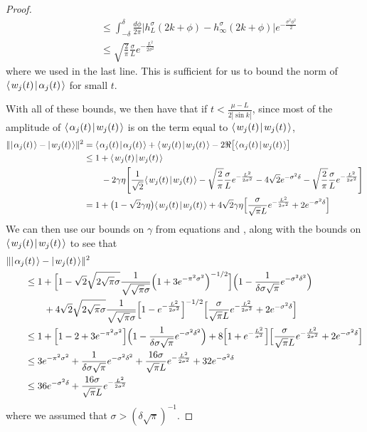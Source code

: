 \documentclass[../thesis-main/thesis-main]{subfiles}
\begin{document}
\begin{proof}
\begin{align}
  & \qquad \leq  \int_{-\delta}^\delta \frac{d\phi}{2\pi} \big|h_L^\sigma(2k + \phi) - h_\infty^\sigma(2k+\phi)\big| e^{-\frac{\sigma^2\phi^2}{2}}\\
  & \qquad \leq \sqrt{\frac{2}{\pi}} \frac{\sigma}{L} e^{-\frac{L^2}{2\sigma^2}}
\end{align}
where we used  in the last line.  This is sufficient for us to bound the norm of $\langle\mspace{2mu} w_j(t) \mspace{2mu} | \mspace{2mu} \alpha_j(t)\mspace{2mu} \rangle$ for small $t$.

With all of these bounds, we then have that if $t < \frac{\mu - L}{2|\sin k|}$, since most of the amplitude of $\langle\mspace{2mu} \alpha_j(t) \mspace{2mu} | \mspace{2mu} w_j(t)\mspace{2mu} \rangle$ is on the term equal to $\langle\mspace{2mu} w_j(t) \mspace{2mu} | \mspace{2mu} w_j(t)\mspace{2mu} \rangle$, 
\begin{align}
  \|{|\mspace{2mu} \alpha_j(t) \mspace{2mu} \rangle - |\mspace{2mu} w_j(t) \mspace{2mu} \rangle}\|^2 &= \langle\mspace{2mu} \alpha_j(t) \mspace{2mu} | \mspace{2mu} \alpha_j(t)\mspace{2mu} \rangle + \langle\mspace{2mu} w_j(t) \mspace{2mu} | \mspace{2mu} w_j(t)\mspace{2mu} \rangle - 2 \Re\big[ \langle\mspace{2mu} \alpha_j(t) \mspace{2mu} | \mspace{2mu} w_j(t)\mspace{2mu} \rangle \big]\\
  & \leq 1 + \langle\mspace{2mu} w_j(t) \mspace{2mu} | \mspace{2mu} w_j(t)\mspace{2mu} \rangle\nonumber\\
  &\qquad  - 2\gamma\eta  \Bigg[ \frac{1}{\sqrt{2}} \langle\mspace{2mu} w_j(t) \mspace{2mu} | \mspace{2mu} w_j(t)\mspace{2mu} \rangle - \sqrt{\frac{2}{\pi}} \frac{\sigma}{L} e^{-\frac{L^2}{2\sigma^2}} - 4 \sqrt{2} e^{-\sigma^2 \delta} - \sqrt{\frac{2}{\pi}} \frac{\sigma}{L} e^{-\frac{L^2}{2\sigma^2}}  \Bigg] \\
  & = 1 + \big( 1 - \sqrt{2} \gamma \eta\big) \langle\mspace{2mu} w_j(t) \mspace{2mu} | \mspace{2mu} w_j(t)\mspace{2mu} \rangle + 4 \sqrt{2} \gamma \eta \Big[\frac{ \sigma}{\sqrt{\pi} L} e^{ - \frac{L^2}{2\sigma^2}} + 2 e^{ - \sigma^2 \delta} \Big] 
\end{align}
We can then use our bounds on $\gamma$ from equations  and , along with the bounds on $\langle\mspace{2mu} w_j(t) \mspace{2mu} | \mspace{2mu} w_j(t)\mspace{2mu} \rangle$ to see that
\begin{align}
  &\|{|\mspace{2mu} \alpha_j(t) \mspace{2mu} \rangle - |\mspace{2mu} w_j(t) \mspace{2mu} \rangle}\|^2 \nonumber\\
  &\qquad \leq 1 + \Big[ 1 - \sqrt{2} \sqrt{2\sqrt{\pi} \sigma} \frac{1}{\sqrt{ \sqrt{\pi} \sigma}} \Big( 1 + 3 e^{ - \pi^2\sigma^2} \Big)^{-1/2} \Big] \Big( 1 - \frac{1}{\delta \sigma \sqrt{\pi}} e^{-\sigma^2\delta^2}\Big)\nonumber\\
  &\qquad \qquad + 4 \sqrt{2} \sqrt{2\sqrt{\pi} \sigma} \frac{1}{\sqrt{ \sqrt{\pi} \sigma}} \Big[ 1 - e^{-\frac{L^2}{2\sigma^2}}\Big]^{-1/2}  \Big[\frac{ \sigma}{\sqrt{\pi} L} e^{ - \frac{L^2}{2\sigma^2}} + 2 e^{ - \sigma^2 \delta} \Big] \\
  & \qquad \leq 1 + \Big[ 1 - 2 + 3 e^{-\pi^2 \sigma^2}\Big] \Big( 1 - \frac{1}{\delta \sigma \sqrt{\pi}} e^{-\sigma^2\delta^2}\Big)
    + 8 \Big[1 + e^{ - \frac{L^2}{\sigma^2}}\Big]  \Big[\frac{ \sigma}{\sqrt{\pi} L} e^{ - \frac{L^2}{2\sigma^2}} + 2 e^{ - \sigma^2 \delta} \Big] \\
  &\qquad\leq  3 e^{ - \pi^2 \sigma^2}  + \frac{1}{\delta \sigma \sqrt{\pi}} e^{-\sigma^2\delta^2} + \frac{ 16\sigma}{\sqrt{\pi} L} e^{ - \frac{L^2}{2\sigma^2}} + 32 e^{ - \sigma^2 \delta}\\
  &\qquad \leq 36 e^{ - \sigma^2 \delta}  + \frac{16 \sigma}{\sqrt{\pi}L} e^{ - \frac{L^2}{2\sigma^2}}
\end{align}
where we assumed that $\sigma > (\delta \sqrt{\pi})^{-1}$.



\end{proof}
\end{document}
